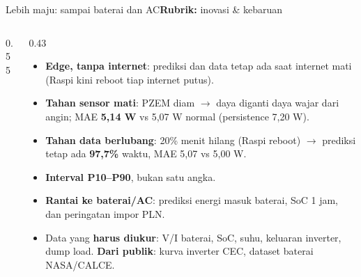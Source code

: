 \documentclass[aspectratio=169, 10pt]{beamer}
\newcommand{\diagram}[1]{}
\newcommand{\kriteria}[1]{\hfill{\scriptsize\mdseries\color{krem!75}\textbf{Rubrik:} #1}}
\begin{document}
\begin{frame}[label=lebihmaju]{Lebih maju: sampai baterai dan AC\kriteria{inovasi \& kebaruan}}
\begin{columns}[T]
\begin{column}{0.55\linewidth}
\resizebox{\linewidth}{!}{\diagram{baterai}}
\end{column}
\begin{column}{0.43\linewidth}
\footnotesize
\begin{itemize}
  \item \textbf{Edge, tanpa internet}: prediksi dan data tetap ada saat internet mati (Raspi kini reboot tiap internet putus).
  \item \textbf{Tahan sensor mati}: PZEM diam $\to$ daya diganti daya wajar dari angin; MAE \textbf{5,14 W} vs 5,07 W normal (persistence 7,20 W).
  \item \textbf{Tahan data berlubang}: 20\% menit hilang (Raspi reboot) $\to$ prediksi tetap ada \textbf{97,7\%} waktu, MAE 5,07 vs 5,00 W.
  \item \textbf{Interval P10--P90}, bukan satu angka.
  \item \textbf{Rantai ke baterai/AC}: prediksi energi masuk baterai, SoC 1 jam, dan peringatan impor PLN.
  \item Data yang \textbf{harus diukur}: V/I baterai, SoC, suhu, keluaran inverter, dump load. \textbf{Dari publik}: kurva inverter CEC, dataset baterai NASA/CALCE.
\end{itemize}
\end{column}
\end{columns}
\end{frame}
\end{document}
